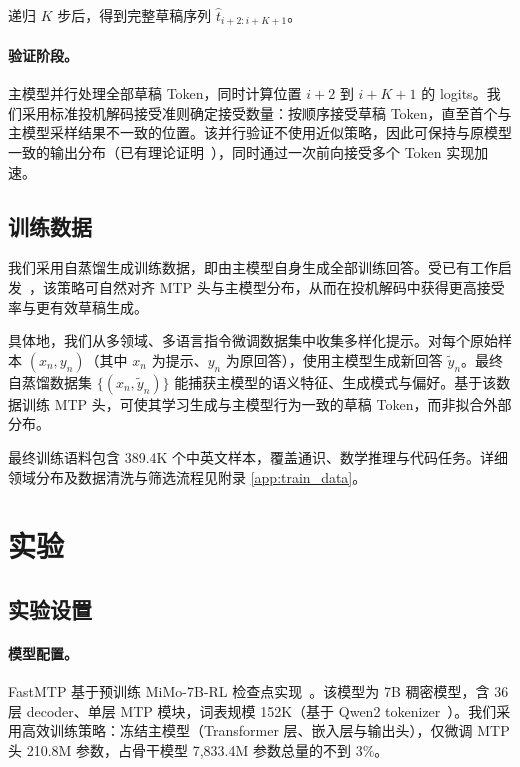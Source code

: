 \documentclass{article} %
\begin{document}
递归 $K$ 步后，得到完整草稿序列 $\hat{t}_{i+2:i+K+1}$。

\paragraph{验证阶段。} 主模型并行处理全部草稿 Token，同时计算位置 $i+2$ 到 $i+K+1$ 的 logits。我们采用标准投机解码接受准则确定接受数量：按顺序接受草稿 Token，直至首个与主模型采样结果不一致的位置。该并行验证不使用近似策略，因此可保持与原模型一致的输出分布（已有理论证明~\citep{leviathan2023fast,chen2023accelerating}），同时通过一次前向接受多个 Token 实现加速。


\subsection{训练数据}

我们采用自蒸馏生成训练数据，即由主模型自身生成全部训练回答。受已有工作启发~\citep{yang2024selfdistillation,cai2024medusa}，该策略可自然对齐 MTP 头与主模型分布，从而在投机解码中获得更高接受率与更有效草稿生成。

具体地，我们从多领域、多语言指令微调数据集中收集多样化提示。对每个原始样本 $(x_n, y_n)$（其中 $x_n$ 为提示、$y_n$ 为原回答），使用主模型生成新回答 $\tilde{y}_n$。最终自蒸馏数据集 $\{(x_n, \tilde{y}_n)\}$ 能捕获主模型的语义特征、生成模式与偏好。基于该数据训练 MTP 头，可使其学习生成与主模型行为一致的草稿 Token，而非拟合外部分布。

最终训练语料包含 389.4K 个中英文样本，覆盖通识、数学推理与代码任务。详细领域分布及数据清洗与筛选流程见附录 \ref{app:train_data}。


\section{实验}

\subsection{实验设置}

\paragraph{模型配置。}
FastMTP 基于预训练 MiMo-7B-RL 检查点实现~\citep{xiaomi2025mimo}。该模型为 7B 稠密模型，含 36 层 decoder、单层 MTP 模块，词表规模 152K（基于 Qwen2 tokenizer~\citep{yang2024qwen2}）。我们采用高效训练策略：冻结主模型（Transformer 层、嵌入层与输出头），仅微调 MTP 头 210.8M 参数，占骨干模型 7,833.4M 参数总量的不到 3\%。
\end{document}
